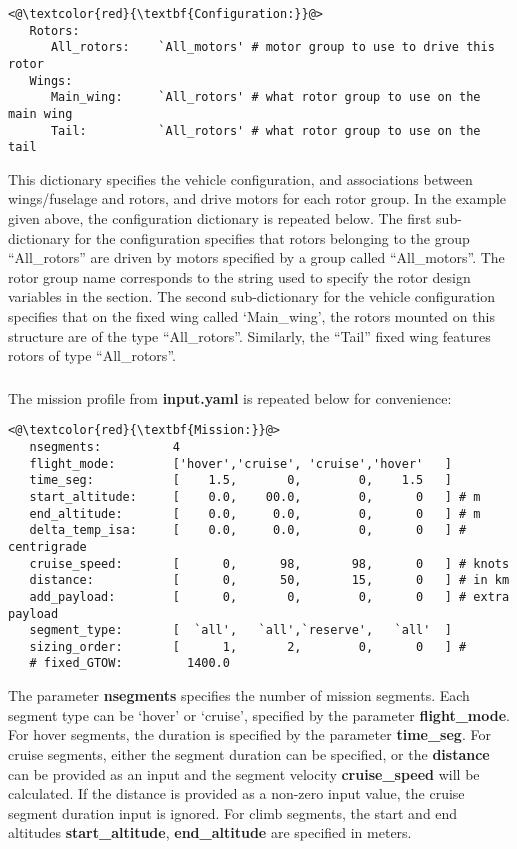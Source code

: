 \subsubsection{}
\begin{lstlisting}
<@\textcolor{red}{\textbf{Configuration:}}@>
   Rotors:
      All_rotors:    `All_motors' # motor group to use to drive this rotor 
   Wings:
      Main_wing:     `All_rotors' # what rotor group to use on the main wing
      Tail:          `All_rotors' # what rotor group to use on the tail
\end{lstlisting}
This dictionary specifies the vehicle configuration, and associations between wings/fuselage and rotors, and drive motors for each rotor group. In the example given above, the configuration dictionary is repeated below. The first sub-dictionary for the configuration specifies that rotors belonging to the group ``All\_rotors'' are driven by motors specified by a group called ``All\_motors''. The rotor group name corresponds to the string used to specify the rotor design variables in the  section. The second sub-dictionary for the vehicle configuration specifies that on the fixed wing called `Main\_wing', the rotors mounted on this structure are of the type ``All\_rotors''. Similarly, the ``Tail'' fixed wing features rotors of type ``All\_rotors''. 

\subsubsection{}
The mission profile from \textbf{input.yaml} is repeated below for convenience:
\begin{lstlisting}
<@\textcolor{red}{\textbf{Mission:}}@>
   nsegments:          4
   flight_mode:        ['hover','cruise', 'cruise','hover'   ]
   time_seg:           [    1.5,       0,        0,    1.5   ]
   start_altitude:     [    0.0,    00.0,        0,      0   ] # m
   end_altitude:       [    0.0,     0.0,        0,      0   ] # m
   delta_temp_isa:     [    0.0,     0.0,        0,      0   ] # centrigrade
   cruise_speed:       [      0,      98,       98,      0   ] # knots
   distance:           [      0,      50,       15,      0   ] # in km
   add_payload:        [      0,       0,        0,      0   ] # extra payload
   segment_type:       [  `all',   `all',`reserve',   `all'  ] 
   sizing_order:       [      1,       2,        0,      0   ] #
   # fixed_GTOW:         1400.0
\end{lstlisting}
The parameter \textbf{nsegments} specifies the number of mission segments. Each segment type can be `hover' or `cruise', specified by the parameter \textbf{flight\_mode}. For hover segments, the duration is specified by the parameter \textbf{time\_seg}. For cruise segments, either the segment duration can be specified, or the \textbf{distance} can be provided as an input and the segment velocity \textbf{cruise\_speed} will be calculated. If the distance is provided as a non-zero input value, the cruise segment duration input is ignored. For climb segments, the start and end altitudes \textbf{start\_altitude}, \textbf{end\_altitude} are specified in meters. 

